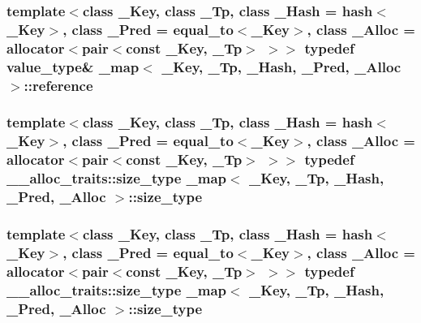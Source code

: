 \subsubsection[{reference}]{\setlength{\rightskip}{0pt plus 5cm}template$<$class \+\_\+\+Key, class \+\_\+\+Tp, class \+\_\+\+Hash = hash$<$\+\_\+\+Key$>$, class \+\_\+\+Pred = equal\+\_\+to$<$\+\_\+\+Key$>$, class \+\_\+\+Alloc = allocator$<$pair$<$const \+\_\+\+Key, \+\_\+\+Tp$>$ $>$$>$ typedef {\bf value\+\_\+type}\& {\bf \+\_\+map}$<$ \+\_\+\+Key, \+\_\+\+Tp, \+\_\+\+Hash, \+\_\+\+Pred, \+\_\+\+Alloc $>$\+::{\bf reference}}\label{class__map_a1c5ff1b6621aa3b9adc9bb651ffd4969}
\hypertarget{class__map_adc37f621be25fda072b12873e60e9fc7}{}
\subsubsection[{size\+\_\+type}]{\setlength{\rightskip}{0pt plus 5cm}template$<$class \+\_\+\+Key, class \+\_\+\+Tp, class \+\_\+\+Hash = hash$<$\+\_\+\+Key$>$, class \+\_\+\+Pred = equal\+\_\+to$<$\+\_\+\+Key$>$, class \+\_\+\+Alloc = allocator$<$pair$<$const \+\_\+\+Key, \+\_\+\+Tp$>$ $>$$>$ typedef \+\_\+\+\_\+alloc\+\_\+traits\+::size\+\_\+type {\bf \+\_\+map}$<$ \+\_\+\+Key, \+\_\+\+Tp, \+\_\+\+Hash, \+\_\+\+Pred, \+\_\+\+Alloc $>$\+::{\bf size\+\_\+type}}\label{class__map_adc37f621be25fda072b12873e60e9fc7}
\hypertarget{class__map_adc37f621be25fda072b12873e60e9fc7}{}
\subsubsection[{size\+\_\+type}]{\setlength{\rightskip}{0pt plus 5cm}template$<$class \+\_\+\+Key, class \+\_\+\+Tp, class \+\_\+\+Hash = hash$<$\+\_\+\+Key$>$, class \+\_\+\+Pred = equal\+\_\+to$<$\+\_\+\+Key$>$, class \+\_\+\+Alloc = allocator$<$pair$<$const \+\_\+\+Key, \+\_\+\+Tp$>$ $>$$>$ typedef \+\_\+\+\_\+alloc\+\_\+traits\+::size\+\_\+type {\bf \+\_\+map}$<$ \+\_\+\+Key, \+\_\+\+Tp, \+\_\+\+Hash, \+\_\+\+Pred, \+\_\+\+Alloc $>$\+::{\bf size\+\_\+type}}\label{class__map_adc37f621be25fda072b12873e60e9fc7}
\hypertarget{class__map_a840dcfbf8726d7ecdd0298ffc6afde52}{}
